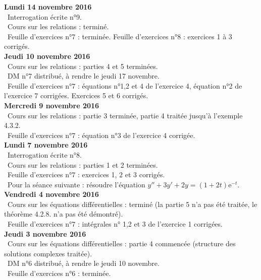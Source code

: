 \documentclass[12pt,a4paper]{article}
\begin{document}
\noindent\textbf{Lundi 14 novembre 2016}\\
\bu\ Interrogation écrite n°9.\\
\bu\ Cours sur les relations : terminé. \\
\bu\ Feuille d'exercices n°7 : terminée. Feuille d'exercices n°8 : exercices 1 à 3 corrigés.\vspace{.4cm}\\

\noindent\textbf{Jeudi 10 novembre 2016}\\
\bu\ Cours sur les relations : parties 4 et 5 terminées. \\
\bu\ DM n°7 distribué, à rendre le jeudi 17 novembre. \\
\bu\ Feuille d'exercices n°7 : équations n°1,2 et 4 de l'exercice 4, équation n°2 de l'exercice 7 corrigées. Exercices 5 et 6 corrigés.\vspace{.4cm}\\

\noindent\textbf{Mercredi 9 novembre 2016}\\
\bu\ Cours sur les relations : partie 3 terminée, partie 4 traitée jusqu'à l'exemple 4.3.2. \\
\bu\ Feuille d'exercices n°7 : équation n°3 de l'exercice 4 corrigée.\vspace{.4cm}\\

\noindent\textbf{Lundi 7 novembre 2016}\\
\bu\ Interrogation écrite n°8.\\
\bu\ Cours sur les relations : parties 1 et 2 terminées. \\
\bu\ Feuille d'exercices n°7 : exercices 1, 2 et 3 corrigés.\\
\bu\ Pour la séance suivante : résoudre l'équation $y''+3y'+2y=(1+2t)\mathrm{e}^{-t}$.\vspace{.4cm}\\

\noindent\textbf{Vendredi 4 novembre 2016}\\
\bu\ Cours sur les équations différentielles : terminé (la partie 5 n'a pas été traitée, le théorème 4.2.8. n'a pas été démontré). \\
\bu\ Feuille d'exercices n°7 : intégrales n° 1,2 et 3 de l'exercice 1 corrigées.\vspace{.4cm}\\

\noindent\textbf{Jeudi 3 novembre 2016}\\
\bu\ Cours sur les équations différentielles : partie 4 commencée (structure des solutions complexes traitée). \\
\bu\ DM n°6 distribué, à rendre le jeudi 10 novembre. \\
\bu\ Feuille d'exercices n°6 : terminée.\vspace{.4cm}\\
\end{document}

